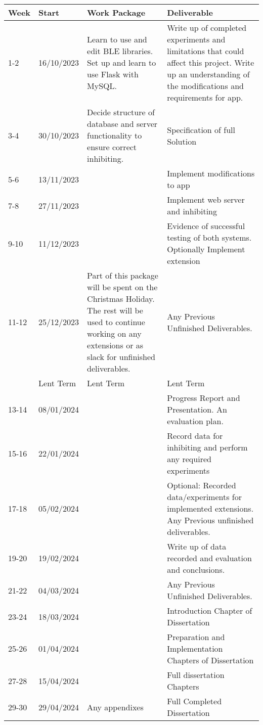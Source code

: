 \documentclass{article}
\begin{document}
\begin{table}[!ht]
\begin{tabular}{|l|l|p{7cm}|p{7cm}|}
\hline
Week & Start & Work Package & Deliverable \\ \hline
1-2 & 16/10/2023 & Learn to use and edit BLE libraries. Set up and learn to use Flask with MySQL. & Write up of completed experiments and limitations that could affect this project. Write up an understanding of the modifications and requirements for app. \\ \hline
3-4 & 30/10/2023 & Decide structure of database and server functionality to ensure correct inhibiting. &  Specification of full Solution \\ \hline
5-6 & 13/11/2023 & ~ & Implement modifications to app\\ \hline
7-8 & 27/11/2023 & ~ & Implement web server and  inhibiting \\ \hline
9-10 & 11/12/2023 & ~ & Evidence of successful testing of both systems. Optionally Implement extension \\ \hline
11-12 & 25/12/2023 & Part of this package will be spent on the Christmas Holiday. The rest will be used to continue working on any extensions or as slack for unfinished deliverables. & Any Previous Unfinished Deliverables. \\ \hline
& Lent Term & Lent Term & Lent Term \\ \hline
13-14 & 08/01/2024 & ~ & Progress Report and Presentation. An evaluation plan. \\ \hline
15-16 & 22/01/2024 & ~ & Record data for inhibiting and perform any required experiments \\ \hline
17-18 & 05/02/2024 & ~ & Optional: Recorded data/experiments for implemented extensions.
Any Previous unfinished deliverables. \\ \hline
19-20 & 19/02/2024 & ~ & Write up of data recorded and evaluation and conclusions. \\ \hline
21-22 & 04/03/2024 & ~ & Any Previous Unfinished Deliverables. \\ \hline
23-24 & 18/03/2024 & ~ & Introduction Chapter of Dissertation \\ \hline
25-26 & 01/04/2024 & ~ & Preparation and Implementation Chapters of Dissertation \\ \hline
27-28 & 15/04/2024 & ~ & Full dissertation Chapters \\ \hline
29-30 & 29/04/2024 & Any appendixes & Full Completed Dissertation \\ \hline
\end{tabular}
\end{table}
\end{document}
